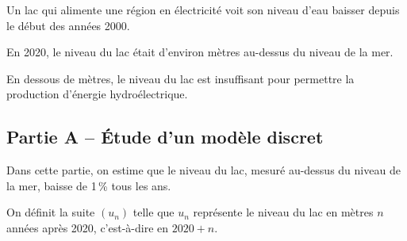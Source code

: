 Un lac qui alimente une région en électricité voit son niveau d'eau baisser depuis le début des années 2000.

	En 2020, le niveau du lac était d'environ  mètres au-dessus du niveau de la mer.

	En dessous de  mètres, le niveau du lac est insuffisant pour permettre la production d'énergie hydroélectrique.

	\subsection*{Partie A -- Étude d'un modèle discret}

	Dans cette partie, on estime que le niveau du lac, mesuré au-dessus du niveau de la mer, baisse de 1\,\% tous les ans.

	On définit la suite $(u_n)$ telle que $u_n$ représente le niveau du lac en mètres $n$ années après 2020, c'est-à-dire en $2020+n$.

